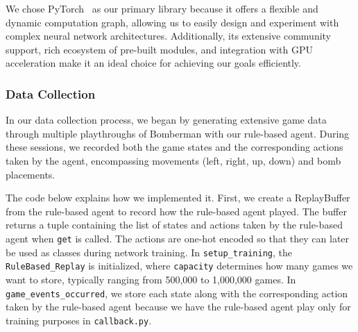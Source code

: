 We chose PyTorch~\cite{Onl:pytorch} as our primary library because it offers a flexible and dynamic computation graph, allowing us to easily design and 
experiment with complex neural network architectures. Additionally, its extensive community support, rich ecosystem of pre-built modules, 
and integration with GPU acceleration make it an ideal choice for achieving our goals efficiently.

\subsubsection*{Data Collection}

In our data collection process, we began by generating extensive game data through multiple playthroughs of Bomberman with 
our rule-based agent. During these sessions, we recorded both the game states and the corresponding actions taken by the agent, 
encompassing movements (left, right, up, down) and bomb placements.

The code below explains how we implemented it. First, we create a ReplayBuffer~\cite{Onl:replaybuff} from the rule-based agent 
to record how the rule-based agent played. The buffer returns a tuple containing the list of states and actions 
taken by the rule-based agent when \verb|get| is called. The actions are one-hot encoded so that they can later be used as 
classes during network training. In \verb|setup_training|, the \verb|RuleBased_Replay| is initialized, where \verb|capacity| determines 
how many games we want to store, typically ranging from 500,000 to 1,000,000 games. In \verb|game_events_occurred|, 
we store each state along with the corresponding action taken by the rule-based agent because we have the 
rule-based agent play only for training purposes in \verb|callback.py|.

